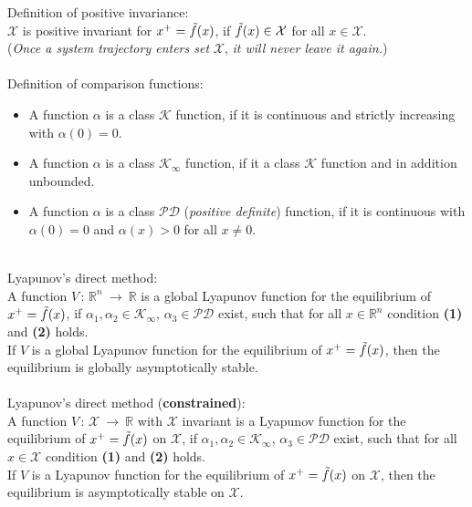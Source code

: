\documentclass[english]{latex4ei/latex4ei_sheet}
\begin{document}
\begin{sectionbox}

Definition of positive invariance:\\
$\mathcal{X}$ is positive invariant for $x^{+}=\Tilde{f}(x)$, if $\Tilde{f}(x)\in\mathcal{X}$ for all $x\in\mathcal{X}$.\\
(\textit{Once a system trajectory enters set} $\mathcal{X}$, \textit{it will never leave it again.})
\\ \\
Definition of comparison functions:
\begin{itemize}
    \item A function $\alpha$ is a class $\mathcal{K}$ function, if it is continuous and strictly increasing with $\alpha(0)=0$.
    \item A function $\alpha$ is a class $\mathcal{K}_{\infty}$ function, if it a class $\mathcal{K}$ function and in addition unbounded.
    \item A function $\alpha$ is a class $\mathcal{PD}$ (\textit{positive definite}) function, if it is continuous with $\alpha(0)=0$ and $\alpha(x)>0$ for all $x\neq0$.
\end{itemize}
\vspace{0.1cm}\\ 

Lyapunov's direct method:\\
A function $V\,:\,\mathbb{R}^{n}\:\rightarrow\:\mathbb{R}$ is a global Lyapunov function for the equilibrium of $x^{+}=\Tilde{f}(x)$, if $\alpha_1,\alpha_2\in\mathcal{K}_{\infty},\,\alpha_3\in\mathcal{PD}$ exist, such that for all $x\in\mathbb{R}^n$ condition \textbf{(1)} and \textbf{(2)} holds.\\
If $V$ is a global Lyapunov function for the equilibrium of $x^{+}=\Tilde{f}(x)$, then the equilibrium is globally asymptotically stable.\\
\\
Lyapunov's direct method (\textbf{constrained}):\\
A function $V\,:\,\mathcal{X}\:\rightarrow\:\mathbb{R}$ with $\mathcal{X}$ invariant is a Lyapunov function for the equilibrium of $x^{+}=\Tilde{f}(x)$ on $\mathcal{X}$, if $\alpha_1,\alpha_2\in\mathcal{K}_{\infty},\,\alpha_3\in\mathcal{PD}$ exist, such that for all $x\in\mathcal{X}$ condition \textbf{(1)} and \textbf{(2)} holds.\\
If $V$ is a Lyapunov function for the equilibrium of $x^{+}=\Tilde{f}(x)$ on $\mathcal{X}$, then the equilibrium is asymptotically stable on $\mathcal{X}$.\\


\end{sectionbox}
\end{document}
